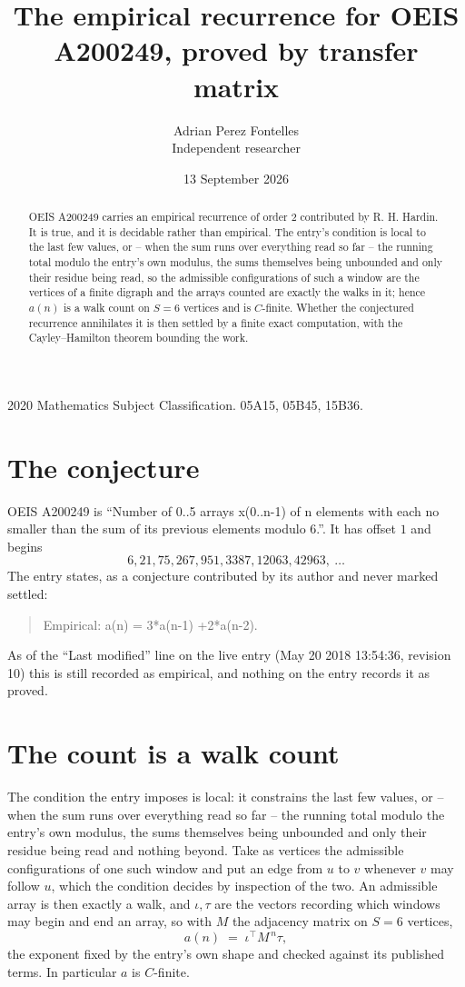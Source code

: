 \documentclass[11pt,a4paper]{article}
\title{The empirical recurrence for OEIS A200249, proved by transfer matrix}
\author{Adrian Perez Fontelles\\ \small Independent researcher}
\date{13 September 2026}
\theoremstyle{plain}
\theoremstyle{definition}
\begin{document}
\maketitle

\begin{abstract}
OEIS A200249 carries an empirical recurrence of order $2$ contributed by R. H. Hardin. It is
true, and it is decidable rather than empirical. The entry's condition is local to the last few values, or -- when the sum runs over everything read so far -- the running total modulo the entry's own modulus, the sums themselves being unbounded and only their residue being read, so
the admissible configurations of such a window are the vertices of a finite digraph and the
arrays counted are exactly the walks in it; hence $a(n)$ is a walk count on $S=6$ vertices
and is $C$-finite. Whether the conjectured recurrence annihilates it is then settled by a
finite exact computation, with the Cayley--Hamilton theorem bounding the work.
\end{abstract}

\noindent\small 2020 Mathematics Subject Classification. 05A15, 05B45, 15B36.\normalsize

\section{The conjecture}

OEIS A200249 is ``Number of 0..5 arrays x(0..n-1) of n elements with each no smaller than the sum of its previous elements modulo 6.''. It has offset $1$ and begins
\[
6, 21, 75, 267, 951, 3387, 12063, 42963,\ \dots
\]
The entry states, as a conjecture contributed by its author and never marked settled:
\begin{quote}
Empirical: a(n) = 3*a(n-1) +2*a(n-2).
\end{quote}
As of the ``Last modified'' line on the live entry (May 20 2018 13:54:36, revision 10) this is still
recorded as empirical, and nothing on the entry records it as proved.

\section{The count is a walk count}

The condition the entry imposes is local: it constrains the last few values, or -- when the sum runs over everything read so far -- the running total modulo the entry's own modulus, the sums themselves being unbounded and only their residue being read and nothing beyond. Take as vertices the admissible configurations of one such window and put an edge from $u$ to $v$ whenever $v$ may follow $u$, which the condition decides by inspection of the two.
An admissible array is then exactly a walk, and $\iota,\tau$ are the vectors recording which windows may begin and end an array, so with $M$ the adjacency matrix on $S=6$ vertices,
\[
a(n)\;=\;\iota^{\!\top}M^{\,n}\tau ,
\]
the exponent fixed by the entry's own shape and checked against its published terms. In
particular $a$ is $C$-finite.
\end{document}
